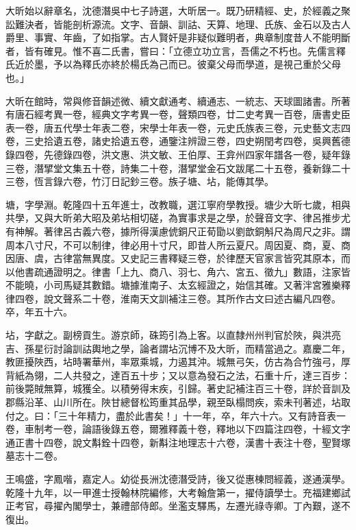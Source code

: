 \begin{pinyinscope}
大昕始以辭章名，沈德潛吳中七子詩選，大昕居一。既乃研精經、史，於經義之聚訟難決者，皆能剖析源流。文字、音韻、訓詁、天算、地理、氏族、金石以及古人爵里、事實、年齒，了如指掌。古人賢奸是非疑似難明者，典章制度昔人不能明斷者，皆有確見。惟不喜二氏書，嘗曰：「立德立功立言，吾儒之不朽也。先儒言釋氏近於墨，予以為釋氏亦終於楊氏為己而已。彼棄父母而學道，是視己重於父母也。」

大昕在館時，常與修音韻述微、續文獻通考、續通志、一統志、天球圖諸書。所著有唐石經考異一卷，經典文字考異一卷，聲類四卷，廿二史考異一百卷，唐書史臣表一卷，唐五代學士年表二卷，宋學士年表一卷，元史氏族表三卷，元史藝文志四卷，三史拾遺五卷，諸史拾遺五卷，通鑒注辨證三卷，四史朔閏考四卷，吳興舊德錄四卷，先德錄四卷，洪文惠、洪文敏、王伯厚、王弇州四家年譜各一卷，疑年錄三卷，潛揅堂文集五十卷，詩集二十卷，潛揅堂金石文跋尾二十五卷，養新錄二十三卷，恆言錄六卷，竹汀日記鈔三卷。族子塘、坫，能傳其學。

塘，字學淵。乾隆四十五年進士，改教職，選江寧府學教授。塘少大昕七歲，相與共學，又與大昕弟大昭及弟坫相切磋，為實事求是之學，於聲音文字、律呂推步尤有神解。著律呂古義六卷，據所得漢慮俿銅尺正荀勖以劉歆銅斛尺為周尺之非。謂周本八寸尺，不可以制律，律必用十寸尺，即昔人所云夏尺。周因夏、商，夏、商因唐、虞，古律當無異度。又史記三書釋疑三卷，於律歷天官家言皆究其原本，而以他書疏通證明之。律書「上九、商八、羽七、角六、宮五、徵九」數語，注家皆不能曉，小司馬疑其數錯。塘據淮南子、太玄經證之，始信其確。又著泮宮雅樂釋律四卷，說文聲系二十卷，淮南天文訓補注三卷。其所作古文曰述古編凡四卷。卒，年五十六。

坫，字獻之。副榜貢生。游京師，硃筠引為上客。以直隸州州判官於陜，與洪亮吉、孫星衍討論訓詁輿地之學，論者謂坫沉博不及大昕，而精當過之。嘉慶二年，教匪擾陜西，坫時署華州，率眾乘城，力遏其沖。城無弓矢，仿古為合竹強弓，厚背紙為翎，二人共發之，達百五十步；又以意為發石之法，石重十斤，達三百步：前後斃賊無算，城獲全。以積勞得末疾，引歸。著史記補注百三十卷，詳於音訓及郡縣沿革、山川所在。陜甘總督松筠重其品學，親至臥榻問疾，索未刊著述，坫取付之。曰：「三十年精力，盡於此書矣！」十一年，卒，年六十六。又有詩音表一卷，車制考一卷，論語後錄五卷，爾雅釋義十卷，釋地以下四篇注四卷，十經文字通正書十四卷，說文斠銓十四卷，新斠注地理志十六卷，漢書十表注十卷，聖賢塚墓志十二卷。

王鳴盛，字鳳喈，嘉定人。幼從長洲沈德潛受詩，後又從惠棟問經義，遂通漢學。乾隆十九年，以一甲進士授翰林院編修，大考翰詹第一，擢侍讀學士。充福建鄉試正考官，尋擢內閣學士，兼禮部侍郎。坐濫支驛馬，左遷光祿寺卿。丁內艱，遂不復出。


\end{pinyinscope}
